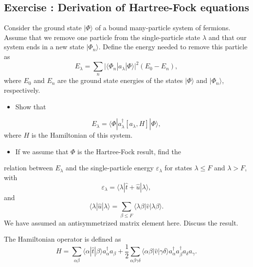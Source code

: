 \documentclass[graybox,sectrefs,envcountresetchap,open=right]{svmonodo}
\newenvironment{doconceexercise}{}{}
\newcounter{doconceexercisecounter}
\begin{document}
\begin{doconceexercise}

\subsection*{Exercise \thedoconceexercisecounter: Derivation of Hartree-Fock equations}


Consider the ground state $|\Phi\rangle$ 
of a bound many-particle system of fermions. Assume that we remove one particle
from the single-particle state $\lambda$ and that our system ends in a new state
$|\Phi_{n}\rangle$. 
Define the energy needed to remove this particle as
\[
E_{\lambda}=\sum_{n}\vert\langle\Phi_{n}|a_{\lambda}|\Phi\rangle\vert^{2}(E_{0}-E_{n}),
\]
where $E_{0}$ and $E_{n}$  are the ground state energies of the states
$|\Phi\rangle$  and  $|\Phi_{n}\rangle$, respectively.
\begin{itemize}
 \item Show that
\end{itemize}

\noindent
\[
E_{\lambda}=\langle\Phi|a_{\lambda}^{\dagger}\left[
a_{\lambda},H \right]|\Phi\rangle,
\]
where $H$ is the Hamiltonian of this system.
\begin{itemize}
 \item If we assume that $\Phi$ is the  Hartree-Fock result, find the 
\end{itemize}

\noindent
relation between $E_{\lambda}$ and the single-particle energy
$\varepsilon_{\lambda}$
for states $\lambda \leq F$ and $\lambda >F$, with
\[
\varepsilon_{\lambda}=\langle\lambda|\hat{t}+\hat{u}|\lambda\rangle,
\]
and
\[
\langle\lambda|\hat{u}|\lambda\rangle=\sum_{\beta \leq F}
\langle\lambda\beta|\hat{v}|\lambda\beta\rangle.
\]
We have assumed an antisymmetrized matrix element here.
Discuss the result.

The Hamiltonian operator is defined as
\[
H=\sum_{\alpha\beta}\langle\alpha|\hat{t}|\beta\rangle a_{\alpha}^{\dagger}a_{\beta}+
\frac{1}{2}\sum_{\alpha\beta\gamma\delta}\langle\alpha\beta|\hat{v}|\gamma\delta\rangle a_{\alpha}^{\dagger}a_{\beta}^{\dagger}a_{\delta}a_{\gamma}.
\]

\end{doconceexercise}


\end{document}
